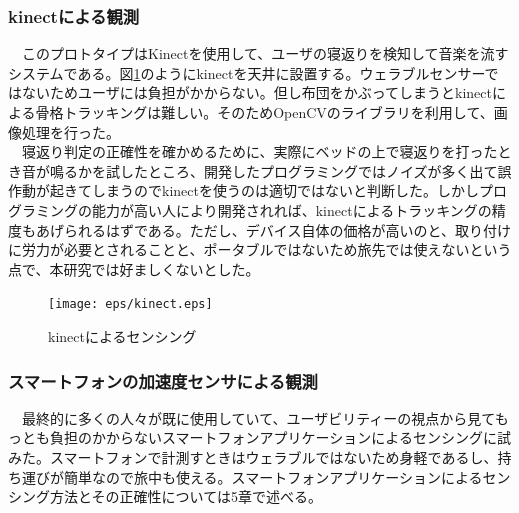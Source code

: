 \subsubsection{kinectによる観測}
　このプロトタイプはKinectを使用して、ユーザの寝返りを検知して音楽を流すシステムである。図\ref{kinect}のようにkinectを天井に設置する。ウェラブルセンサーではないためユーザには負担がかからない。但し布団をかぶってしまうとkinectによる骨格トラッキングは難しい。そのためOpenCVのライブラリを利用して、画像処理を行った。\\
　寝返り判定の正確性を確かめるために、実際にベッドの上で寝返りを打ったとき音が鳴るかを試したところ、開発したプログラミングではノイズが多く出て誤作動が起きてしまうのでkinectを使うのは適切ではないと判断した。しかしプログラミングの能力が高い人により開発されれば、kinectによるトラッキングの精度もあげられるはずである。ただし、デバイス自体の価格が高いのと、取り付けに労力が必要とされることと、ポータブルではないため旅先では使えないという点で、本研究では好ましくないとした。

\begin{figure}[htbp]
\begin{center}
\texttt{[image: eps/kinect.eps]}
\caption{kinectによるセンシング}
\label{kinect}
\end{center}
\end{figure}

\subsubsection{スマートフォンの加速度センサによる観測}
　最終的に多くの人々が既に使用していて、ユーザビリティーの視点から見てもっとも負担のかからないスマートフォンアプリケーションによるセンシングに試みた。スマートフォンで計測すときはウェラブルではないため身軽であるし、持ち運びが簡単なので旅中も使える。スマートフォンアプリケーションによるセンシング方法とその正確性については5章で述べる。

